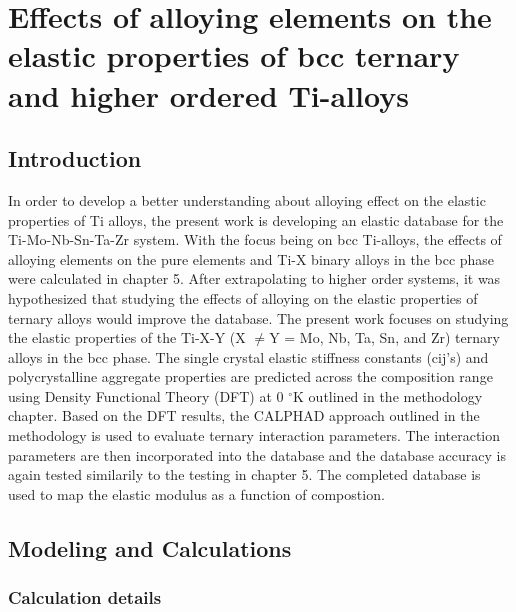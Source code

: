 \chapter{Effects of alloying elements on the elastic properties of bcc ternary and higher ordered Ti-alloys}

\section{Introduction}

In order to develop a better understanding about alloying effect on the elastic properties of Ti alloys, the present work is developing an elastic database for the Ti-Mo-Nb-Sn-Ta-Zr system. With the focus being on bcc Ti-alloys, the effects of alloying elements on the pure elements and Ti-X binary alloys in the bcc phase were calculated in chapter 5. After extrapolating to higher order systems, it was hypothesized that studying the effects of alloying on the elastic properties of ternary alloys would improve the database. The present work focuses on studying the elastic properties of the Ti-X-Y (X $\neq$Y = Mo, Nb, Ta, Sn, and Zr) ternary alloys in the bcc phase. The single crystal elastic stiffness constants (cij’s) and polycrystalline aggregate properties are predicted across the composition range using Density Functional Theory (DFT) at 0 $^\circ$K outlined in the methodology chapter. Based on the DFT results, the CALPHAD approach outlined in the methodology is used to evaluate ternary interaction parameters. The interaction parameters are then incorporated into the database and the database accuracy is again tested similarily to the testing in chapter 5. The completed database is used to map the elastic modulus as a function of compostion. 

\section{Modeling and Calculations}

\subsection{Calculation details}


